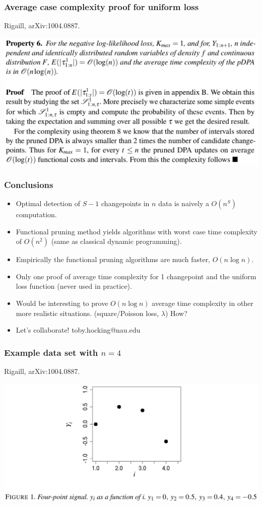 \documentclass{beamer}
\begin{document}
\begin{frame}
  \frametitle{Average case complexity proof for uniform loss}
  Rigaill, arXiv:1004.0887.
  
  \includegraphics[width=\textwidth]{screenshot-proposition-6}
\end{frame} 

\begin{frame}[fragile]
  \frametitle{Conclusions}

  \begin{itemize}
  \item Optimal detection of $S-1$ changepoints in $n$ data is naively
    a $O(n^S)$ computation.  
  \item Functional pruning method yields algorithms with worst case
    time complexity of $O(n^2)$ (same as classical dynamic
    programming).
  \item Empirically the functional pruning algorithms are much faster,
    $O(n\log n)$.
  \item Only one proof of average time complexity for 1 changepoint
    and the uniform loss function (never used in practice).
  \item Would be interesting to prove $O(n\log n)$ average time complexity in
    other more realistic situations. (square/Poisson loss, $\lambda$) How?
  \item Let's collaborate! toby.hocking@nau.edu
  \end{itemize}
  
\end{frame}


\begin{frame}
  \frametitle{Example data set with $n=4$}
  Rigaill, arXiv:1004.0887.

  \includegraphics[width=\textwidth]{screenshot-figure-1}
\end{frame}
\end{document}
